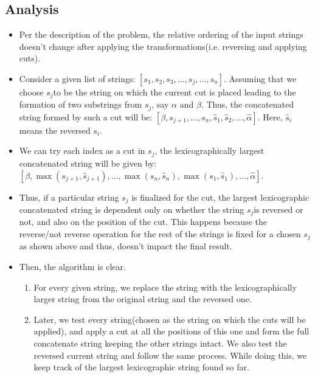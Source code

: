 \subsection{Analysis}
\begin{itemize}
\item Per the description of the problem, the relative ordering of the input strings doesn't change after applying the transformations(i.e. reversing and applying cuts).
\item Consider a given list of strings: $[s_1,s_2,s_3,\ldots,s_j,\ldots, s_n]$. Assuming that we choose $s_j$​ to be the string on which the current cut is placed leading to the formation of two substrings from $s_j$, say $\alpha$ and $\beta$. Thus, the concatenated string formed by such a cut will be: $[\beta,s_{j+1},\ldots,s_n,\hat{s}_1,\hat{s}_2,\ldots,\hat{\alpha}]$. Here, $\hat{s}_i$​ means the reversed $s_i$.
\item We can try each index as a cut in $s_j$, the lexicographically largest concatenated string will be given by: $[\beta,\max(s_{j+1},\hat{s}_{j+1}),\ldots,\max(s_{n},\hat{s}_{n}),\max(s_{1},\hat{s}_{1}),\ldots,\hat{\alpha}]$.
\item Thus, if a particular string $s_j$ is finalized for the cut, the largest lexicographic concatenated string is dependent only on whether the string $s_j$​ is reversed or not, and also on the position of the cut. This happens because the reverse/not reverse operation for the rest of the strings is fixed for a chosen $s_j$​ as shown above and thus, doesn't impact the final result.
\item Then, the algorithm is clear. 
\begin{enumerate}
\item For every given string, we replace the string with the lexicographically larger string from the original string and the reversed one. 
\item Later, we test every string(chosen as the string on which the cuts will be applied), and apply a cut at all the positions of this one and form the full concatenate string keeping the other strings intact. We also test the reversed current string and follow the same process. While doing this, we keep track of the largest lexicographic string found so far.
\end{enumerate}
\end{itemize}

